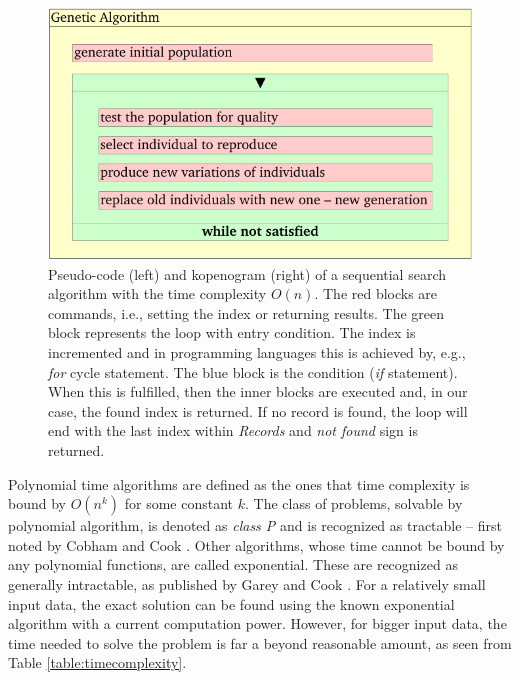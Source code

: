 \vspace{10mm} %

\begin{figure}[ht]
    \centering
    \includegraphics[page=3]{chapter3/GA-kopenogram2-crop.pdf}    
    \caption{Pseudo-code (left) and kopenogram (right) of a sequential search algorithm with the time complexity $O(n)$. The red blocks are commands, i.e., setting the index or returning results. The green block represents the loop with entry condition. The index is incremented and in programming languages this is achieved by, e.g., \emph{for} cycle statement. The blue block is the condition (\emph{if} statement). When this is fulfilled, then the inner blocks are executed and, in our case, the found index is returned. If no record is found, the loop will end with the last index within \emph{Records} and \emph{not found} sign is returned.}
    \label{fig:search}
\end{figure}

Polynomial time algorithms are defined as the ones that time complexity is bound by $O(n^k)$ for some constant $k$. The class of problems, solvable by polynomial algorithm, is denoted as \emph{class P} and is recognized as tractable -- first noted by Cobham and Cook \cite{Cobham1964,Cook1983}. Other algorithms, whose time cannot be bound by any polynomial functions, are called exponential. These are recognized as generally intractable, as published by Garey and Cook \cite{Garey1979,Cook1983}. For a relatively small input data, the exact solution can be found using the known exponential algorithm with a current computation power. However, for bigger input data, the time needed to solve the problem is far a beyond reasonable amount, as seen from Table \ref{table:timecomplexity}.

